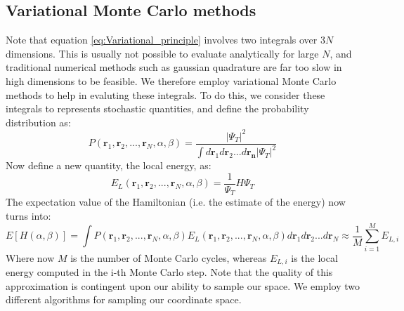 \documentclass[a4paper, 10pt]{article}
\begin{document}
	\subsection{Variational Monte Carlo methods}
	Note that equation \ref{eq:Variational_principle} involves two integrals over $3N$ dimensions. This is usually not possible to evaluate analytically for large $N$, and traditional numerical methods such as gaussian quadrature are far too slow in high dimensions to be feasible. We therefore employ variational Monte Carlo methods to help in evaluting these integrals. To do this, we consider these integrals to represents stochastic quantities, and define the probability distribution as:
	\begin{equation}
	P(\boldsymbol{r}_1, \boldsymbol{r}_2,...,\boldsymbol{r}_N, \alpha,\beta)=\frac{|\Psi_T|^2}{\int d\boldsymbol{r}_1d\boldsymbol{r}_2...d\boldsymbol{r_n}|\Psi_T|^2}
	\end{equation}
	Now define a new quantity, the local energy, as:
	\begin{equation}\label{eq:Local_energy_general_expression}
	E_L(\boldsymbol{r}_1, \boldsymbol{r}_2,...,\boldsymbol{r}_N, \alpha,\beta)=\frac{1}{\Psi_T}H\Psi_T
	\end{equation}
	The	expectation value of the Hamiltonian (i.e. the estimate of the energy) now turns into:
	\begin{equation}\label{eq:Expectation_Hamiltonian}
	E[H(\alpha, \beta)]=\int P(\boldsymbol{r}_1, \boldsymbol{r}_2,...,\boldsymbol{r}_N, \alpha,\beta)E_L(\boldsymbol{r}_1, \boldsymbol{r}_2,...,\boldsymbol{r}_N, \alpha,\beta)d\boldsymbol{r}_1d\boldsymbol{r}_2...d\boldsymbol{r}_N\approx \frac{1}{M}\sum_{i=1}^M E_{L,i}
	\end{equation}
	Where now $M$ is the number of Monte Carlo cycles, whereas $E_{L,i}$ is the local energy computed in the i-th Monte Carlo step. Note that the quality of this approximation is contingent upon our ability to sample our space. We employ two different algorithms for sampling our coordinate space.
\end{document}
